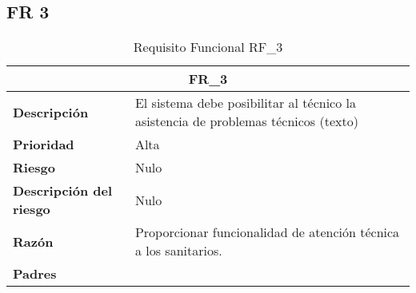 \documentclass{scrreprt}
\begin{document}
\subsection{FR 3}
    \begin{table}[H]
    
    \label{tab:my-table}
    
    \begin{tabular}{|p{5cm}|p{11cm}|}
    \hline
    \multicolumn{2}{|c|}{\textbf{FR_3}} \\
    \hline
    \textbf{Descripción  }                      & El sistema debe posibilitar al técnico la asistencia de problemas técnicos (texto)                                                                            \\ \hline
    \textbf{Prioridad}                          & Alta                                                                                              \\ \hline
    \textbf{Riesgo}                          & Nulo                                                                                                \\ \hline
    \textbf{Descripción del riesgo}                    & Nulo                                                                               \\ \hline
    \textbf{Razón}                   & Proporcionar funcionalidad de atención técnica a los sanitarios.                                                                                               \\ \hline
    \textbf{Padres}                               &  \\  \hline
    \end{tabular}%
    
    \caption{Requisito Funcional RF_3}
\end{table}
\end{document}

